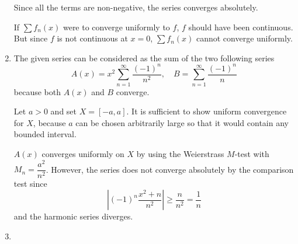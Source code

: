 \documentclass[12pt]{report}
\newcommand{\numl}[1]{\item[\large\textbf{\sffamily #1.}]}
\newcommand{\abs}[1]{\left| #1 \right|}
\begin{document}
\begin{enumerate}
    Since all the terms are non-negative, the series converges absolutely.

    If \(\sum f_n(x)\) were to converge uniformly to \(f\), \(f\) should have been continuous. But since \(f\) is not continuous at \(x = 0\), \(\sum f_n(x)\) cannot converge uniformly.

    \numl{4} The given series can be considered as the sum of the two following series
    \[
        A(x) = x^2 \sum_{n=1}^\infty \frac{(-1)^n}{n^2}, \quad B = \sum_{n=1}^\infty \frac{(-1)^n}{n}
    \]
    because both \(A(x)\) and \(B\) converge.

    Let \(a > 0\) and set \(X = [-a, a]\). It is sufficient to show uniform convergence for \(X\), because \(a\) can be chosen arbitrarily large so that it would contain any bounded interval.
    
    \(A(x)\) converges uniformly on \(X\) by using the Weierstrass \(M\)-test with \(M_n = \dfrac{a^2}{n^2}\). However, the series does not converge absolutely by the comparison test since
    \[
        \abs{(-1)^n \frac{x^2 + n}{n^2}} \geq \frac{n}{n^2} = \frac{1}{n}
    \]
    and the harmonic series diverges.

    \numl{5}
\end{enumerate}
\end{document}
